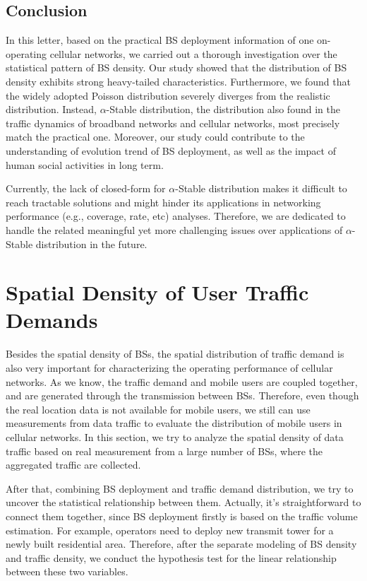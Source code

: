 \subsection{Conclusion}
In this letter, based on the practical BS deployment information of one on-operating cellular networks, we carried out a thorough investigation over the statistical pattern of BS density. Our study showed that the distribution of BS density exhibits strong heavy-tailed characteristics. Furthermore, we found that the widely adopted Poisson distribution severely diverges from the realistic distribution. Instead, $\alpha$-Stable distribution, the distribution also found in the traffic dynamics of broadband networks and cellular networks, most precisely match the practical one. Moreover, our study could contribute to the understanding of evolution trend of BS deployment, as well as the impact of human social activities in long term.

Currently, the lack of closed-form for $\alpha$-Stable distribution makes it difficult to reach tractable solutions and might hinder its applications in networking performance (e.g., coverage, rate, etc) analyses. Therefore, we are dedicated to handle the related meaningful yet more challenging issues over applications of $\alpha$-Stable distribution in the future.
\section{Spatial Density of User Traffic Demands} \label{sec4-trafden}
Besides the spatial density of BSs, the spatial distribution of traffic demand is also very important for characterizing the operating performance of cellular networks. As we know, the traffic demand and mobile users are coupled together, and are generated through the transmission between BSs. Therefore, even though the real location data is not available for mobile users, we still can use measurements from data traffic to evaluate the distribution of mobile users in cellular networks. In this section, we try to analyze the spatial density of data traffic based on real measurement from a large number of BSs, where the aggregated traffic are collected.

After that, combining BS deployment and traffic demand distribution, we try to uncover the statistical relationship between them. Actually, it's straightforward to connect them together, since BS deployment firstly is based on the traffic volume estimation. For example, operators need to deploy new transmit tower for a newly built residential area. Therefore, after the separate modeling of BS density and traffic density, we conduct the hypothesis test for the linear relationship between these two variables.
